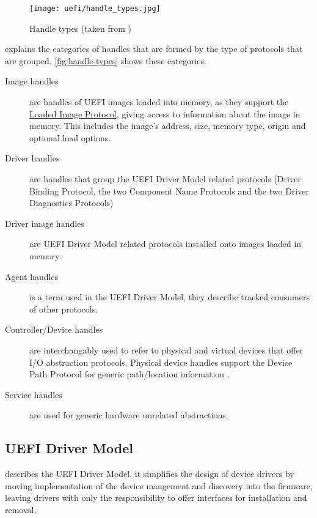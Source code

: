 \begin{figure}[htb]%
    \centering%
    \texttt{[image: uefi/handle\_types.jpg]}%
    \caption{Handle types (taken from \cite[Figure 3]{tianocore-edk2-driver-writer-s-guide})}%
    \label{fig:handle-types}%
\end{figure}

\cite{tianocore-edk2-driver-writer-s-guide} explains the categories of handles that are formed by the type of protocols that are grouped. \autoref{fig:handle-types} shows these categories.

\begin{description}
    \item[Image handles] are handles of \ac{UEFI} images loaded into memory, as they support the \hyperref[lst:loaded-image-protocol]{Loaded Image Protocol}, giving access to information about the image in memory. This includes the image's address, size, memory type, origin and optional load options.
    \item[Driver handles] are handles that group the \ac{UEFI} Driver Model related protocols (Driver Binding Protocol, the two Component Name Protocols and the two Driver Diagnostics Protocols)
    \item[Driver image handles] are \ac{UEFI} Driver Model related protocols installed onto images loaded in memory.
    \item[Agent handles] is a term used in the \ac{UEFI} Driver Model, they describe tracked consumers of other protocols.
    \item[Controller/Device handles] are interchangably used to refer to physical and virtual devices that offer \ac{I/O} abstraction protocols.
        Physical device handles support the Device Path Protocol for generic path/location information \cite[Section 10.2]{uefi-spec}.
    \item[Service handles] are used for generic hardware unrelated abstractions.
\end{description}

\subsection{\acs{UEFI} Driver Model}

\cite[Section 2.5.2]{uefi-spec} describes the \acs{UEFI} Driver Model, it simplifies the design of device drivers by moving implementation of the device mangement and discovery into the firmware, leaving drivers with only the responsibility to offer interfaces for installation and removal.

